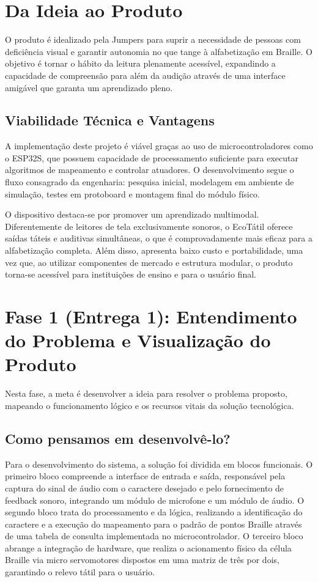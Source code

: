 \documentclass[12pt, a4paper]{article}
\begin{document}
\newpage
\section{Da Ideia ao Produto}

O produto é idealizado pela Jumpers para suprir a necessidade de pessoas com deficiência visual e garantir autonomia no que tange à alfabetização em Braille. O objetivo é tornar o hábito da leitura plenamente acessível, expandindo a capacidade de compreensão para além da audição através de uma interface amigável que garanta um aprendizado pleno.

\subsection{Viabilidade Técnica e Vantagens}
A implementação deste projeto é viável graças ao uso de microcontroladores como o ESP32S, que possuem capacidade de processamento suficiente para executar algoritmos de mapeamento e controlar atuadores. O desenvolvimento segue o fluxo consagrado da engenharia: pesquisa inicial, modelagem em ambiente de simulação, testes em protoboard e montagem final do módulo físico.

O dispositivo destaca-se por promover um aprendizado multimodal. Diferentemente de leitores de tela exclusivamente sonoros, o EcoTátil oferece saídas táteis e auditivas simultâneas, o que é comprovadamente mais eficaz para a alfabetização completa. Além disso, apresenta baixo custo e portabilidade, uma vez que, ao utilizar componentes de mercado e estrutura modular, o produto torna-se acessível para instituições de ensino e para o usuário final.

\section{Fase 1 (Entrega 1): Entendimento do Problema e Visualização do Produto}

Nesta fase, a meta é desenvolver a ideia para resolver o problema proposto, mapeando o funcionamento lógico e os recursos vitais da solução tecnológica.

\subsection{Como pensamos em desenvolvê-lo?}
Para o desenvolvimento do sistema, a solução foi dividida em blocos funcionais. O primeiro bloco compreende a interface de entrada e saída, responsável pela captura do sinal de áudio com o caractere desejado e pelo fornecimento de feedback sonoro, integrando um módulo de microfone e um módulo de áudio. O segundo bloco trata do processamento e da lógica, realizando a identificação do caractere e a execução do mapeamento para o padrão de pontos Braille através de uma tabela de consulta implementada no microcontrolador. O terceiro bloco abrange a integração de hardware, que realiza o acionamento físico da célula Braille via micro servomotores dispostos em uma matriz de três por dois, garantindo o relevo tátil para o usuário.
\end{document}
